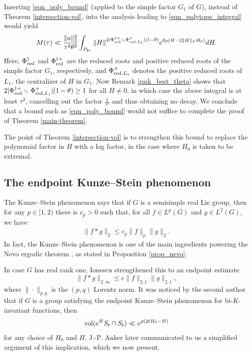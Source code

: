 \documentclass[12pt]{amsart}
\theoremstyle{remark}
\begin{document}
Inserting \eqref{eqn_poly_bound} (applied to the simple factor $G_1$ of $G$), instead of Theorem \ref{intersection-vol}, into the analysis leading to \eqref{eqn_polytope_integral} would yield
    \begin{gather*}
        M(\tau) \ll \frac{\|a\|^2_2}{\tau^2\theta^2} \int_{P_{2 \tau}} \|H\|^{2 |\Phi_{\textnormal{red}}^{1 +} \smallsetminus \Phi_{\textnormal{red}, L_1}^+| (1-\theta)} e^{\theta \rho(H - 2 \|H\|_P H_0)} dH.
    \end{gather*}
Here, $\Phi_{\textnormal{red}}^1$ and $\Phi_{\textnormal{red}}^{1 +}$ are the reduced roots and positive reduced roots of the simple factor $G_1$, respectively, and $\Phi_{\textnormal{red}, L_1}^+$ denotes the positive reduced roots of $L_1$, the centralizer of $H$ in $G_1$. Now Remark \ref{rmk_best_theta} shows that $2 |\Phi_{\textnormal{red}}^{1 +} \smallsetminus \Phi_{\textnormal{red}, L_1}^+| (1-\theta) \geq 1$ for all $H\neq0$, in which case the above integral is at least $\tau^2$, cancelling out the factor $\frac{1}{\tau^2}$ and thus obtaining no decay. We conclude that a bound such as \eqref{eqn_poly_bound} would not suffice to complete the proof of Theorem \ref{main-theorem}. 

The point of Theorem \ref{intersection-vol} is to strengthen this bound to replace the polynomial factor in $H$ with a log factor, in the case where $H_0$ is taken to be extremal.

\subsection{The endpoint Kunze--Stein phenomenon} \label{subsec_eks}
The Kunze--Stein phenomenon \cite{Kunze_Stein} says that if $G$ is a semisimple real Lie group, then for any $p \in [1, 2)$ there is $c_p>0$ such that, for all $f \in L^p(G)$ and $g \in L^2(G)$, we have
\begin{gather*}
    \|f * g\|_2 \leq c_p \|f\|_p \|g\|_2.
\end{gather*}
In fact, the Kunze--Stein phenomenon is one of the main ingredients powering the Nevo ergodic theorem \cite{Nevo}, as stated in Proposition \ref{prop_nevo}.

In case $G$ has real rank one, Ionescu \cite{Ionescu_00} strengthened this to an endpoint estimate
\begin{equation}\label{endpoint-K-S}
    \|f * g \|_{2, \infty} \leq c \|f\|_{2, 1} \|g\|_{2, 1},
\end{equation}
where $\|\cdot\|_{p, q}$ is the $(p, q)$ Lorentz norm. It was noticed by the second author that if $G$ is a group satisfying the endpoint Kunze--Stein phenomenon for bi-$K$-invariant functions, then
\[
\textnormal{vol}(e^H S_t \cap S_t) \ll e^{\rho(2 t H_0 - H)}
\]
for any choice of $H_0$ and $H$. J.-P. Anker later communicated to us a simplified argument of this implication, which we now present.
\end{document}

